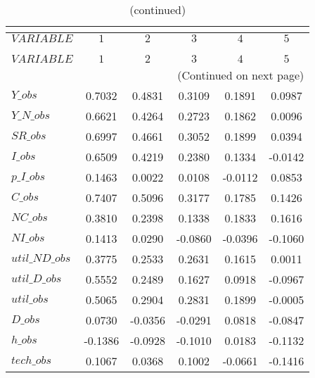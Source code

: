  
\begin{center}
\begin{longtable}{lccccc} 
\caption{AUTOCORRELATION OF SIMULATED VARIABLES}\\
 \label{Table:sim_autocorr_matrix}\\
\toprule 
$VARIABLE       $	 & 	 $          1$	 & 	 $          2$	 & 	 $          3$	 & 	 $          4$	 & 	 $          5$\\
\midrule \endfirsthead 
\caption{(continued)}\\
 \toprule \\ 
$VARIABLE       $	 & 	 $          1$	 & 	 $          2$	 & 	 $          3$	 & 	 $          4$	 & 	 $          5$\\
\midrule \endhead 
\midrule \multicolumn{6}{r}{(Continued on next page)} \\ \bottomrule \endfoot 
\bottomrule \endlastfoot 
$Y\_obs         $	 & 	     0.7032	 & 	     0.4831	 & 	     0.3109	 & 	     0.1891	 & 	     0.0987 \\ 
$Y\_N\_obs      $	 & 	     0.6621	 & 	     0.4264	 & 	     0.2723	 & 	     0.1862	 & 	     0.0096 \\ 
$SR\_obs        $	 & 	     0.6997	 & 	     0.4661	 & 	     0.3052	 & 	     0.1899	 & 	     0.0394 \\ 
$I\_obs         $	 & 	     0.6509	 & 	     0.4219	 & 	     0.2380	 & 	     0.1334	 & 	    -0.0142 \\ 
$p\_I\_obs      $	 & 	     0.1463	 & 	     0.0022	 & 	     0.0108	 & 	    -0.0112	 & 	     0.0853 \\ 
$C\_obs         $	 & 	     0.7407	 & 	     0.5096	 & 	     0.3177	 & 	     0.1785	 & 	     0.1426 \\ 
$NC\_obs        $	 & 	     0.3810	 & 	     0.2398	 & 	     0.1338	 & 	     0.1833	 & 	     0.1616 \\ 
$NI\_obs        $	 & 	     0.1413	 & 	     0.0290	 & 	    -0.0860	 & 	    -0.0396	 & 	    -0.1060 \\ 
$util\_ND\_obs  $	 & 	     0.3775	 & 	     0.2533	 & 	     0.2631	 & 	     0.1615	 & 	     0.0011 \\ 
$util\_D\_obs   $	 & 	     0.5552	 & 	     0.2489	 & 	     0.1627	 & 	     0.0918	 & 	    -0.0967 \\ 
$util\_obs      $	 & 	     0.5065	 & 	     0.2904	 & 	     0.2831	 & 	     0.1899	 & 	    -0.0005 \\ 
$D\_obs         $	 & 	     0.0730	 & 	    -0.0356	 & 	    -0.0291	 & 	     0.0818	 & 	    -0.0847 \\ 
$h\_obs         $	 & 	    -0.1386	 & 	    -0.0928	 & 	    -0.1010	 & 	     0.0183	 & 	    -0.1132 \\ 
$tech\_obs      $	 & 	     0.1067	 & 	     0.0368	 & 	     0.1002	 & 	    -0.0661	 & 	    -0.1416 \\ 
\end{longtable}
 \end{center}
